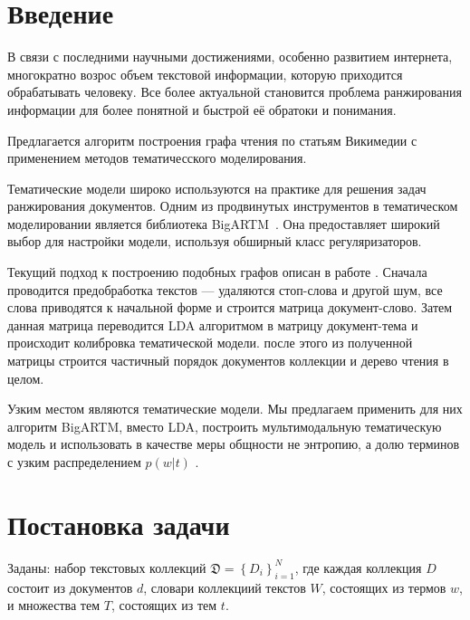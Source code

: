 \documentclass[12pt,twoside]{article}
\title
{Нелинейное ранжирование результатов разведочного информационного поиска.}
\author
{Мамонов~К.\,Р.,  Воронцов~К.\,В., Еремеев~М.\,А.} %
[Мамонов~К.\,Р.$^1$, Воронцов~К.\,В.$^1$, Еремеев~М.\,А.$^1$] %
\begin{document}
	
	\maketitle
	
	\section{Введение}
	В связи с последними научными достижениями, особенно развитием интернета, многократно возрос объем текстовой информации, которую приходится обрабатывать человеку. Все более актуальной становится проблема ранжирования информации для более понятной и быстрой её обратоки и понимания.
	
	Предлагается алгоритм построения графа чтения по статьям Викимедии \cite{WikiPedia} с применением методов тематичесского моделирования.
	
	Тематические модели широко используются на практике для решения задач ранжирования документов. Одним из продвинутых инструментов в тематическом моделировании является библиотека BigARTM~\cite{vorontsov2015bigartm}. Она предоставляет широкий выбор для настройки модели, используя обширный класс регуляризаторов. 
	
	Текущий подход к построению подобных графов описан в работе \cite{conf/icde/KoutrikaLS15}. Сначала проводится предобработка текстов --- удаляются стоп-слова и другой шум, все слова приводятся к начальной форме и строится матрица документ-слово. Затем данная матрица переводится LDA алгоритмом\cite{blei2003latent} в матрицу документ-тема и происходит колибровка тематической модели. после этого из полученной матрицы строится частичный порядок документов коллекции и дерево чтения в целом.
	
	Узким местом являются тематические модели. Мы предлагаем применить для них алгоритм BigARTM\cite{vorontsov2015bigartm}, вместо LDA\cite{blei2003latent}, построить мультимодальную тематическую модель \cite{Ianina2016} и использовать в качестве меры общности не энтропию, а долю терминов с узким распределением $p(w|t)$ .
	
	\section{Постановка задачи}
	
	Заданы: набор текстовых коллекций $\mathfrak{D} = \left\{D_i\right\}_{i=1}^{N}$, где каждая коллекция $D$ состоит из документов $d$, словари коллекциий текстов $W$, состоящих из термов $w$, и множества тем $T$, состоящих из тем  $t$.
	
\end{document}
